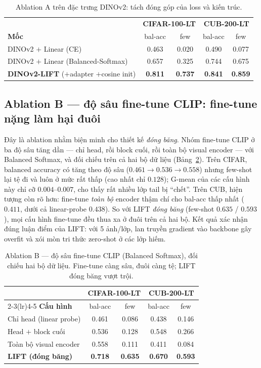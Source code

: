 \begin{table}[H]
\centering
\caption{Ablation A trên đặc trưng DINOv2: tách đóng góp của loss và kiến trúc.}
\label{tab:ablationA}
\begin{tabular}{lcccc}
\toprule
& \multicolumn{2}{c}{\textbf{CIFAR-100-LT}} & \multicolumn{2}{c}{\textbf{CUB-200-LT}} \\
\textbf{Mốc} & bal-acc & few & bal-acc & few \\
\midrule
DINOv2 $+$ Linear (CE) & 0.463 & 0.020 & 0.490 & 0.077 \\
DINOv2 $+$ Linear (Balanced-Softmax) & 0.657 & 0.325 & 0.744 & 0.675 \\
\textbf{DINOv2-LIFT} ($+$adapter $+$cosine init) & \textbf{0.811} & \textbf{0.737} & \textbf{0.841} & \textbf{0.859} \\
\bottomrule
\end{tabular}
\end{table}

\subsection{Ablation B --- độ sâu fine-tune CLIP: fine-tune nặng làm hại đuôi}

Đây là ablation nhằm biện minh cho thiết kế \emph{đóng băng}. Nhóm fine-tune CLIP ở ba độ sâu tăng
dần --- chỉ head, rồi block cuối, rồi toàn bộ visual encoder --- với Balanced Softmax, và đối chiếu
trên cả hai bộ dữ liệu (Bảng~\ref{tab:ablationB}). Trên CIFAR, balanced accuracy có tăng theo độ sâu
($0.461\to0.536\to0.558$) nhưng few-shot lại tệ đi và luôn ở mức rất thấp (cao nhất chỉ $0.128$);
G-mean của các cấu hình này chỉ cỡ $0.004$--$0.007$, cho thấy rất nhiều lớp tail bị ``chết''. Trên
CUB, hiện tượng còn rõ hơn: fine-tune \emph{toàn bộ} encoder thậm chí cho bal-acc thấp nhất
($0.411$, dưới cả linear-probe $0.438$). So với LIFT \emph{đóng băng} (few-shot $0.635$ / $0.593$),
mọi cấu hình fine-tune đều thua xa ở đuôi trên cả hai bộ. Kết quả xác nhận đúng luận điểm của LIFT:
với 5 ảnh/lớp, lan truyền gradient vào backbone gây overfit và xói mòn tri thức zero-shot ở các lớp
hiếm.

\begin{table}[H]
\centering
\caption{Ablation B --- độ sâu fine-tune CLIP (Balanced Softmax), đối chiếu hai bộ dữ liệu. Fine-tune
càng sâu, đuôi càng tệ; LIFT đóng băng vượt trội.}
\label{tab:ablationB}
\begin{tabular}{lcccc}
\toprule
 & \multicolumn{2}{c}{\textbf{CIFAR-100-LT}} & \multicolumn{2}{c}{\textbf{CUB-200-LT}} \\
\cmidrule(lr){2-3}\cmidrule(lr){4-5}
\textbf{Cấu hình} & bal-acc & few & bal-acc & few \\
\midrule
Chỉ head (linear probe) & 0.461 & 0.086 & 0.438 & 0.146 \\
Head $+$ block cuối & 0.536 & 0.128 & 0.548 & 0.266 \\
Toàn bộ visual encoder & 0.558 & 0.111 & 0.411 & 0.084 \\
\midrule
\textbf{LIFT (đóng băng)} & \textbf{0.718} & \textbf{0.635} & \textbf{0.670} & \textbf{0.593} \\
\bottomrule
\end{tabular}
\end{table}

